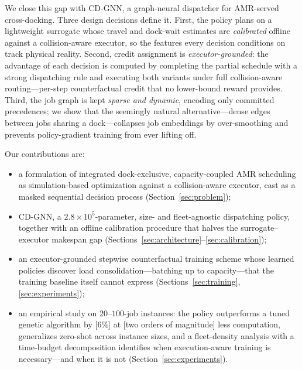 We close this gap with \textsc{CD-GNN}, a graph-neural dispatcher for
AMR-served cross-docking. Three design decisions define it. First, the
policy plans on a lightweight surrogate whose travel and dock-wait
estimates are \emph{calibrated} offline against a collision-aware
executor, so the features every decision conditions on track physical
reality. Second, credit assignment is \emph{executor-grounded}: the
advantage of each decision is computed by completing the partial
schedule with a strong dispatching rule and executing both variants
under full collision-aware routing---per-step counterfactual credit
that no lower-bound reward provides. Third, the job graph is kept
\emph{sparse and dynamic}, encoding only committed precedences; we
show that the seemingly natural alternative---dense edges between jobs
sharing a dock---collapses job embeddings by over-smoothing and
prevents policy-gradient training from ever lifting off.

Our contributions are:
\begin{itemize}
\item a formulation of integrated dock-exclusive, capacity-coupled
  AMR scheduling as simulation-based optimization against a
  collision-aware executor, cast as a masked sequential decision
  process (Section~\ref{sec:problem});
\item \textsc{CD-GNN}, a $2.8\times10^{5}$-parameter,
  size- and fleet-agnostic dispatching policy, together with an
  offline calibration procedure that halves the surrogate--executor
  makespan gap (Sections~\ref{sec:architecture}--\ref{sec:calibration});
\item an executor-grounded stepwise counterfactual training scheme
  whose learned policies discover load consolidation---batching up to
  capacity---that the training baseline itself cannot express
  (Sections~\ref{sec:training}, \ref{sec:experiments});
\item an empirical study on $20$--$100$-job instances: the policy
  outperforms a tuned genetic algorithm by [$6\%$] at [two orders of
  magnitude] less computation, generalizes zero-shot across instance
  sizes, and a fleet-density analysis with a time-budget decomposition
  identifies when execution-aware training is necessary---and when it
  is not (Section~\ref{sec:experiments}).
\end{itemize}
